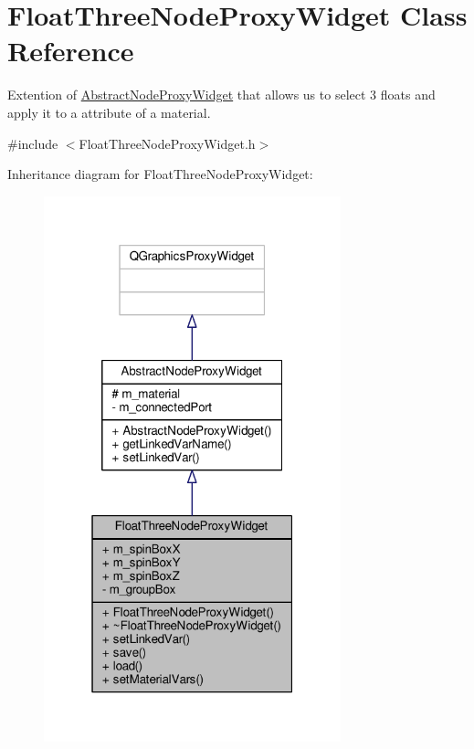 \hypertarget{class_float_three_node_proxy_widget}{\section{Float\-Three\-Node\-Proxy\-Widget Class Reference}
\label{class_float_three_node_proxy_widget}
}


Extention of \hyperlink{class_abstract_node_proxy_widget}{Abstract\-Node\-Proxy\-Widget} that allows us to select 3 floats and apply it to a attribute of a material.  




{\ttfamily \#include $<$Float\-Three\-Node\-Proxy\-Widget.\-h$>$}



Inheritance diagram for Float\-Three\-Node\-Proxy\-Widget\-:
\nopagebreak
\begin{figure}[H]
\begin{center}
\leavevmode
\includegraphics[width=244pt]{class_float_three_node_proxy_widget__inherit__graph}
\end{center}
\end{figure}


